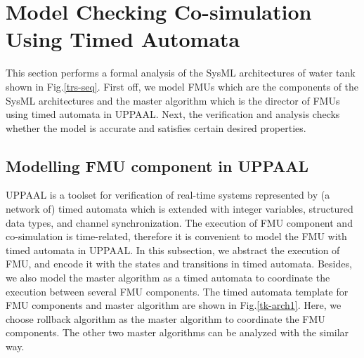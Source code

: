 \section{Model Checking Co-simulation Using Timed Automata}
\label{sec:ma&uppaal}
This section performs a formal analysis of the SysML architectures of water tank shown in Fig.\ref{trs-seq}. First off, we model FMUs which are the components of the SysML architectures and the master algorithm which is the director of FMUs using timed automata in UPPAAL. Next, the verification and analysis checks whether the model is accurate and satisfies certain desired properties. 

\subsection{Modelling FMU component in UPPAAL}
UPPAAL \cite{BehrmannDLHPYH06} is a toolset for verification of real-time systems represented by (a network of) timed automata which is extended with integer variables, structured data types, and channel synchronization. The execution of FMU component and co-simulation is time-related, therefore it is convenient to model the FMU with timed automata in UPPAAL. In this subsection, we abstract the execution of FMU, and encode it with the states and transitions in timed automata. Besides, we also model the master algorithm as a timed automata to coordinate the execution between several FMU components. The timed automata template for FMU components and master algorithm are shown in Fig.\ref{tk-arch1}. Here, we choose rollback algorithm as the master algorithm to coordinate the FMU components. The other two master algorithms can be analyzed with the similar way.


